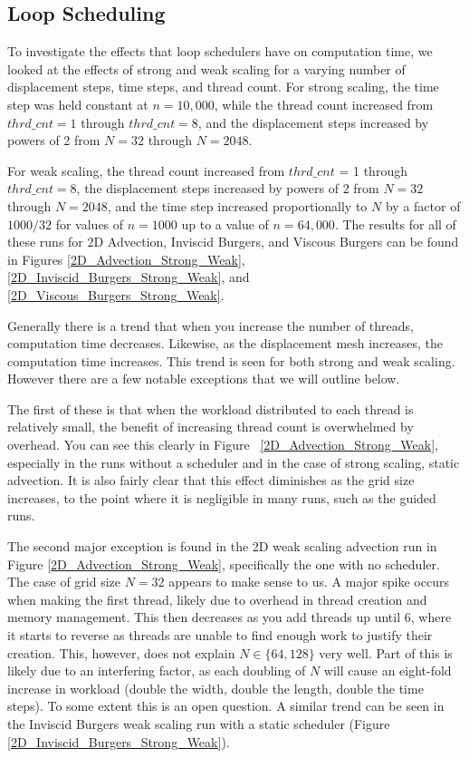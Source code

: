 \documentclass{article}
\begin{document}
\subsection{Loop Scheduling}

To investigate the effects that loop schedulers have on computation time, we looked at the effects of strong and weak scaling for a varying number of displacement steps, time steps, and thread count. For strong scaling, the time step was held constant at $n = 10,000$, while the thread count increased from $thrd\_cnt = 1$ through $thrd\_cnt = 8$, and the displacement steps increased by powers of 2 from $N = 32$ through $N = 2048$.

For weak scaling, the thread count increased from $thrd\_cnt$ = 1 through $thrd\_cnt = 8$, the displacement steps increased by powers of 2 from $N = 32$ through $N = 2048$, and the time step increased proportionally to $N$ by a factor of $1000/32$ for values of $n = 1000$ up to a value of $n = 64,000$. The results for all of these runs for 2D Advection, Inviscid Burgers, and Viscous Burgers can be found in Figures \ref{2D_Advection_Strong_Weak}, \ref{2D_Inviscid_Burgers_Strong_Weak}, and \ref{2D_Viscous_Burgers_Strong_Weak}.

Generally there is a trend that when you increase the number of threads, computation time decreases. Likewise, as the displacement mesh increases, the computation time increases. This trend is seen for both strong and weak scaling. However there are a few notable exceptions that we will outline below.

The first of these is that when the workload distributed to each thread is relatively small, the benefit of increasing thread count is overwhelmed by overhead. You can see this clearly in Figure ~\ref{2D_Advection_Strong_Weak}, especially in the runs without a scheduler and in the case of strong scaling, static advection. It is also fairly clear that this effect diminishes as the grid size increases, to the point where it is negligible in many runs, such as the guided runs.

The second major exception is found in the 2D weak scaling advection run in Figure \ref{2D_Advection_Strong_Weak}, specifically the one with no scheduler. The case of grid size $N =32$ appears to make sense to us. A major spike occurs when making the first thread, likely due to overhead in thread creation and memory management. This then decreases as you add threads up until 6, where it starts to reverse as threads are unable to find enough work to justify their creation. This, however, does not explain $N \in \{64, 128\}$ very well. Part of this is likely due to an interfering factor, as each doubling of $N$ will cause an eight-fold increase in workload (double the width, double the length, double the time steps). To some extent this is an open question. A similar trend can be seen in the Inviscid Burgers weak scaling run with a static scheduler (Figure \ref{2D_Inviscid_Burgers_Strong_Weak}).
\end{document}
